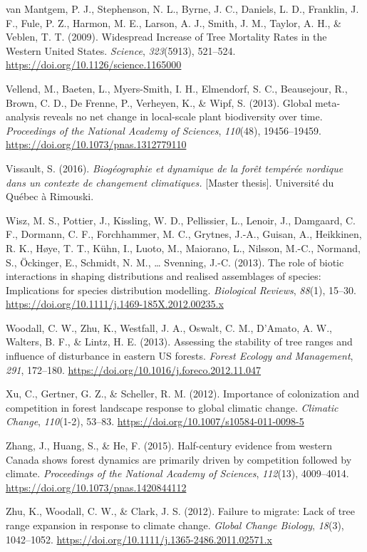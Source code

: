 \documentclass[
]{article}
\begin{document}
\leavevmode\hypertarget{ref-van_mantgem_widespread_2009}{}%
van Mantgem, P. J., Stephenson, N. L., Byrne, J. C., Daniels, L. D.,
Franklin, J. F., Fule, P. Z., Harmon, M. E., Larson, A. J., Smith, J.
M., Taylor, A. H., \& Veblen, T. T. (2009). Widespread Increase of Tree
Mortality Rates in the Western United States. \emph{Science},
\emph{323}(5913), 521--524.
\url{https://doi.org/10.1126/science.1165000}

\leavevmode\hypertarget{ref-vellend_global_2013}{}%
Vellend, M., Baeten, L., Myers-Smith, I. H., Elmendorf, S. C.,
Beausejour, R., Brown, C. D., De Frenne, P., Verheyen, K., \& Wipf, S.
(2013). Global meta-analysis reveals no net change in local-scale plant
biodiversity over time. \emph{Proceedings of the National Academy of
Sciences}, \emph{110}(48), 19456--19459.
\url{https://doi.org/10.1073/pnas.1312779110}

\leavevmode\hypertarget{ref-vissault_biogeographie_2016}{}%
Vissault, S. (2016). \emph{Biogéographie et dynamique de la forêt
tempérée nordique dans un contexte de changement climatiques.} {[}Master
thesis{]}. Université du Québec à Rimouski.

\leavevmode\hypertarget{ref-wisz_role_2013}{}%
Wisz, M. S., Pottier, J., Kissling, W. D., Pellissier, L., Lenoir, J.,
Damgaard, C. F., Dormann, C. F., Forchhammer, M. C., Grytnes, J.-A.,
Guisan, A., Heikkinen, R. K., Høye, T. T., Kühn, I., Luoto, M.,
Maiorano, L., Nilsson, M.-C., Normand, S., Öckinger, E., Schmidt, N. M.,
\ldots{} Svenning, J.-C. (2013). The role of biotic interactions in
shaping distributions and realised assemblages of species: Implications
for species distribution modelling. \emph{Biological Reviews},
\emph{88}(1), 15--30.
\url{https://doi.org/10.1111/j.1469-185X.2012.00235.x}

\leavevmode\hypertarget{ref-woodall_assessing_2013}{}%
Woodall, C. W., Zhu, K., Westfall, J. A., Oswalt, C. M., D'Amato, A. W.,
Walters, B. F., \& Lintz, H. E. (2013). Assessing the stability of tree
ranges and influence of disturbance in eastern US forests. \emph{Forest
Ecology and Management}, \emph{291}, 172--180.
\url{https://doi.org/10.1016/j.foreco.2012.11.047}

\leavevmode\hypertarget{ref-xu_importance_2012}{}%
Xu, C., Gertner, G. Z., \& Scheller, R. M. (2012). Importance of
colonization and competition in forest landscape response to global
climatic change. \emph{Climatic Change}, \emph{110}(1-2), 53--83.
\url{https://doi.org/10.1007/s10584-011-0098-5}

\leavevmode\hypertarget{ref-zhang_half-century_2015}{}%
Zhang, J., Huang, S., \& He, F. (2015). Half-century evidence from
western Canada shows forest dynamics are primarily driven by competition
followed by climate. \emph{Proceedings of the National Academy of
Sciences}, \emph{112}(13), 4009--4014.
\url{https://doi.org/10.1073/pnas.1420844112}

\leavevmode\hypertarget{ref-zhu_failure_2012}{}%
Zhu, K., Woodall, C. W., \& Clark, J. S. (2012). Failure to migrate:
Lack of tree range expansion in response to climate change. \emph{Global
Change Biology}, \emph{18}(3), 1042--1052.
\url{https://doi.org/10.1111/j.1365-2486.2011.02571.x}
\end{document}
